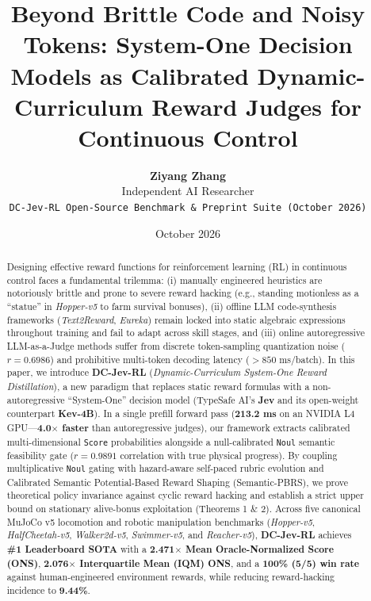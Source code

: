 \documentclass[10pt]{article}
\title{\textbf{Beyond Brittle Code and Noisy Tokens: System-One Decision Models as Calibrated Dynamic-Curriculum Reward Judges for Continuous Control}}
\author{\textbf{Ziyang Zhang} \\ Independent AI Researcher \\ \texttt{DC-Jev-RL Open-Source Benchmark \& Preprint Suite (October 2026)}}
\date{October 2026}
\begin{document}
\maketitle

\begin{abstract}
Designing effective reward functions for reinforcement learning (RL) in continuous control faces a fundamental trilemma: (i) manually engineered heuristics are notoriously brittle and prone to severe reward hacking (e.g., standing motionless as a ``statue'' in \textit{Hopper-v5} to farm survival bonuses), (ii) offline LLM code-synthesis frameworks (\textit{Text2Reward}, \textit{Eureka}) remain locked into static algebraic expressions throughout training and fail to adapt across skill stages, and (iii) online autoregressive LLM-as-a-Judge methods suffer from discrete token-sampling quantization noise ($r = 0.6986$) and prohibitive multi-token decoding latency ($>850$ ms/batch). In this paper, we introduce \textbf{DC-Jev-RL} (\textit{Dynamic-Curriculum System-One Reward Distillation}), a new paradigm that replaces static reward formulas with a non-autoregressive ``System-One'' decision model (TypeSafe AI's \textbf{Jev} and its open-weight counterpart \textbf{Kev-4B}). In a single prefill forward pass (\textbf{213.2 ms} on an NVIDIA L4 GPU---\textbf{4.0$\times$ faster} than autoregressive judges), our framework extracts calibrated multi-dimensional \texttt{Score} probabilities alongside a null-calibrated \texttt{Noul} semantic feasibility gate ($r = 0.9891$ correlation with true physical progress). By coupling multiplicative \texttt{Noul} gating with hazard-aware self-paced rubric evolution and Calibrated Semantic Potential-Based Reward Shaping (Semantic-PBRS), we prove theoretical policy invariance against cyclic reward hacking and establish a strict upper bound on stationary alive-bonus exploitation (Theorems 1 \& 2). Across five canonical MuJoCo v5 locomotion and robotic manipulation benchmarks (\textit{Hopper-v5}, \textit{HalfCheetah-v5}, \textit{Walker2d-v5}, \textit{Swimmer-v5}, and \textit{Reacher-v5}), \textbf{DC-Jev-RL} achieves \textbf{\#1 Leaderboard SOTA} with a \textbf{2.471$\times$ Mean Oracle-Normalized Score (ONS)}, \textbf{2.076$\times$ Interquartile Mean (IQM) ONS}, and a \textbf{100\% (5/5) win rate} against human-engineered environment rewards, while reducing reward-hacking incidence to \textbf{9.44\%}.
\end{abstract}
\end{document}
